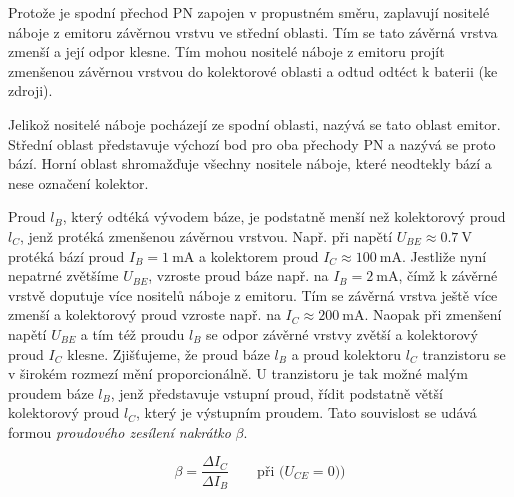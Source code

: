 {      
      
      Protože je spodní přechod PN zapojen v propustném směru, zaplavují nositelé náboje z emitoru
      závěrnou vrstvu ve střední oblasti. Tím se tato závěrná vrstva zmenší a její odpor klesne. Tím
      mohou nositelé náboje z emitoru projít zmenšenou závěrnou vrstvou do kolektorové oblasti a
      odtud odtéct k baterii (ke zdroji).

      Jelikož nositelé náboje pocházejí ze spodní oblasti, nazývá se tato oblast emitor. Střední
      oblast představuje výchozí bod pro oba přechody PN a nazývá se proto bází. Horní oblast
      shromažďuje všechny nositele náboje, které neodtekly bází a nese označení kolektor.

      
      Proud \(l_B\), který odtéká vývodem báze, je podstatně menší než kolektorový proud \(l_C\),
      jenž protéká zmenšenou závěrnou vrstvou. Např. při napětí \(U_{BE} \approx \SI{0.7}{\V}\)
      protéká bází proud \(I_B = \SI{1}{\mA}\) a kolektorem proud \(I_C \approx \SI{100}{\mA}\).
      Jestliže nyní nepatrné zvětšíme \(U_{BE}\), vzroste proud báze např. na \(I_B = \SI{2}{\mA}\),
      čímž k závěrné vrstvě doputuje více nositelů náboje z emitoru. Tím se závěrná vrstva ještě
      více zmenší a kolektorový proud vzroste např. na \(I_C \approx \SI{200}{\mA}\). Naopak při
      zmenšení napětí \(U_{BE}\) a tím též proudu \(l_B\) se odpor závěrné vrstvy zvětší a
      kolektorový proud \(I_C\) klesne. Zjišťujeme, že proud báze \(l_B\) a proud kolektoru \(l_C\)
      tranzistoru se v širokém rozmezí mění proporcionálně. U tranzistoru je tak možné malým proudem
      báze \(l_B\), jenž představuje vstupní proud, řídit podstatně větší kolektorový proud \(l_C\),
      který je výstupním proudem. Tato souvislost se udává formou \emph{proudového zesílení
      nakrátko} \(\beta\).

      \begin{equation*}
        \beta = \dfrac{\Delta I_C}{\Delta I_B} \qquad \text{při (\(U_{CE} = 0\)))}
      \end{equation*}
        
      
}

